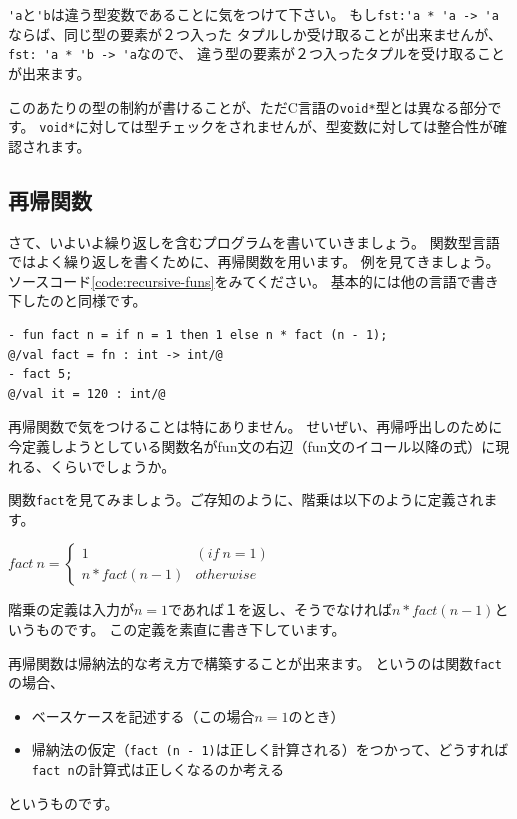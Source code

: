 \documentclass[11pt,a4paper]{article}
\begin{document}
\lstinline{'a}と\lstinline{'b}は違う型変数であることに気をつけて下さい。
もし\lstinline{fst:'a * 'a -> 'a}ならば、同じ型の要素が２つ入った
タプルしか受け取ることが出来ませんが、\lstinline{fst: 'a * 'b -> 'a}なので、
違う型の要素が２つ入ったタプルを受け取ることが出来ます。

このあたりの型の制約が書けることが、ただC言語の\lstinline{void*}型とは異なる部分です。
\lstinline{void*}に対しては型チェックをされませんが、型変数に対しては整合性が確認されます。

\subsection{再帰関数}

さて、いよいよ繰り返しを含むプログラムを書いていきましょう。
関数型言語ではよく繰り返しを書くために、再帰関数を用います。
例を見てきましょう。ソースコード\ref{code:recursive-funs}をみてください。
基本的には他の言語で書き下したのと同様です。


\begin{lstlisting}[caption=再帰関数,label=code:recursive-funs]
- fun fact n = if n = 1 then 1 else n * fact (n - 1);
@/val fact = fn : int -> int/@
- fact 5;
@/val it = 120 : int/@
\end{lstlisting}

再帰関数で気をつけることは特にありません。
せいぜい、再帰呼出しのために今定義しようとしている関数名がfun文の右辺（fun文のイコール以降の式）に現れる、くらいでしょうか。

関数\lstinline{fact}を見てみましょう。ご存知のように、階乗は以下のように定義されます。

$fact \ n = \begin{cases} 1 & (if \ n = 1) \\ n * fact (n - 1) & otherwise \end{cases}$

階乗の定義は入力が$n=1$であれば１を返し、そうでなければ$n * fact (n - 1)$というものです。
この定義を素直に書き下しています。

再帰関数は帰納法的な考え方で構築することが出来ます。
というのは関数\lstinline{fact}の場合、
\begin{itemize}
\item ベースケースを記述する（この場合$n=1$のとき）
\item 帰納法の仮定（\lstinline{fact (n - 1)}は正しく計算される）をつかって、どうすれば\lstinline{fact n}の計算式は正しくなるのか考える
\end{itemize}
というものです。
\end{document}
